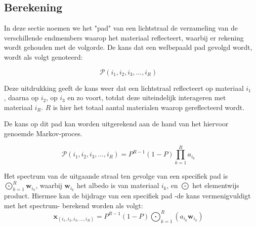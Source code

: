 \documentclass[12pt]{report}
\DeclareMathOperator*{\Odot}{\bigodot}
\begin{document}

\subsection{Berekening}

In deze sectie noemen we het "pad" van een lichtstraal de verzameling van de verschillende endmembers waarop het materiaal reflecteert, waarbij er rekening wordt gehouden met de volgorde. De kans dat een welbepaald pad gevolgd wordt, wordt als volgt genoteerd:

\begin{equation}
\mathcal{P}(i_1,i_2,i_3,...,i_R)
\end{equation}

Deze uitdrukking geeft de kans weer dat een lichtstraal reflecteert op materiaal $i_1$, daarna op $i_2$, op $i_3$ en zo voort, totdat deze uiteindelijk interageren met materiaal $i_R$. $R$ is hier het totaal aantal materialen waarop gereflecteerd wordt.

De kans op dit pad kan worden uitgerekend aan de hand van het hiervoor genoemde Markov-proces\cite{mlinmix}. 

\begin{equation}
\mathcal{P}(i_1,i_2,i_3,...,i_R) = P^{R-1} (1-P) \prod_{k=1}^R a_{i_k}
\end{equation}

Het spectrum van de uitgaande straal ten gevolge van een specifiek pad is $\Odot_{k=1}^R \bm{w}_{i_k}$, waarbij $\bm{w}_{i_k}$ het albedo is van materiaal $i_k$, en $\Odot$ het elementwijs product. Hiermee kan de bijdrage van een specifiek pad -de kans vermenigvuldigt met het spectrum- berekend worden als volgt:
\begin{equation}
\bm{x}_{(i_1,i_2,i_3,...,i_R)} = P^{R-1} (1-P) \Odot_{k=1}^R \left(a_{i_k} \bm{w}_{i_k}\right)
\end{equation}
\end{document}
